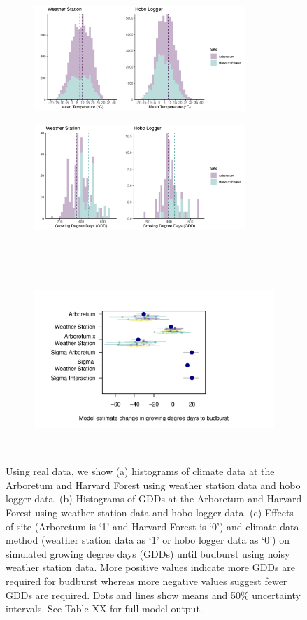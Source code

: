 \documentclass{article}\usepackage[]{graphicx}\usepackage[]{color}
\begin{document}
\begin{figure}
  \begin{subfigure}{.5\linewidth}
    \caption{}
    \centering
    \includegraphics[height=4cm, width=8cm]{..//analyses/figures/clim_methods_real.pdf}
    \label{fig:gddreal}
  \end{subfigure}%
    \begin{subfigure}{.5\linewidth}
      \caption{}
      \centering
      \includegraphics[height=4cm, width=8cm]{..//analyses/figures/gdd_methods_real.pdf}
    \label{fig:climreal}
  \end{subfigure}\\[1ex]
  \begin{subfigure}{\linewidth}
	    \caption{}
      \centering
      \includegraphics[height=7cm, width=11cm]{..//analyses/figures/muplot_urban_real.pdf}
      \label{fig:muplotreal}
  \end{subfigure}
\caption{ Using real data, we show (a) histograms of climate data at the Arboretum and Harvard Forest using weather station data and hobo logger data. (b) Histograms of GDDs at the Arboretum and Harvard Forest using weather station data and hobo logger data. (c) Effects of site (Arboretum is `1' and Harvard Forest is `0') and climate data method (weather station data as `1' or hobo logger data as `0') on simulated growing degree days (GDDs) until budburst using noisy weather station data. More positive values indicate more GDDs are required for budburst whereas more negative values suggest fewer GDDs are required. Dots and lines show means and 50\% uncertainty intervals. See Table XX for full model output.}

\end{figure}
\end{document}
